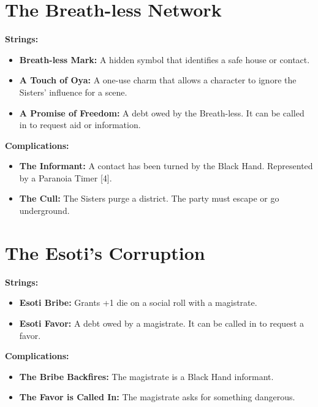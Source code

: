 \documentclass[11pt,twoside]{book}
\newenvironment{mechanicbox}{\begin{mdframed}[style=mechanicbox]}{\end{mdframed}}
\begin{document}
\section{The Breath-less Network}

\begin{mechanicbox}
\textbf{Strings:}
\begin{itemize}
    \item \textbf{Breath-less Mark:} A hidden symbol that identifies a safe house or contact.
    \item \textbf{A Touch of Oya:} A one-use charm that allows a character to ignore the Sisters' influence for a scene.
    \item \textbf{A Promise of Freedom:} A debt owed by the Breath-less. It can be called in to request aid or information.
\end{itemize}

\textbf{Complications:}
\begin{itemize}
    \item \textbf{The Informant:} A contact has been turned by the Black Hand. Represented by a Paranoia Timer [4].
    \item \textbf{The Cull:} The Sisters purge a district. The party must escape or go underground.
\end{itemize}
\end{mechanicbox}

\section{The Esoti's Corruption}

\begin{mechanicbox}
\textbf{Strings:}
\begin{itemize}
    \item \textbf{Esoti Bribe:} Grants +1 die on a social roll with a magistrate.
    \item \textbf{Esoti Favor:} A debt owed by a magistrate. It can be called in to request a favor.
\end{itemize}

\textbf{Complications:}
\begin{itemize}
    \item \textbf{The Bribe Backfires:} The magistrate is a Black Hand informant.
    \item \textbf{The Favor is Called In:} The magistrate asks for something dangerous.
\end{itemize}
\end{mechanicbox}
\end{document}
